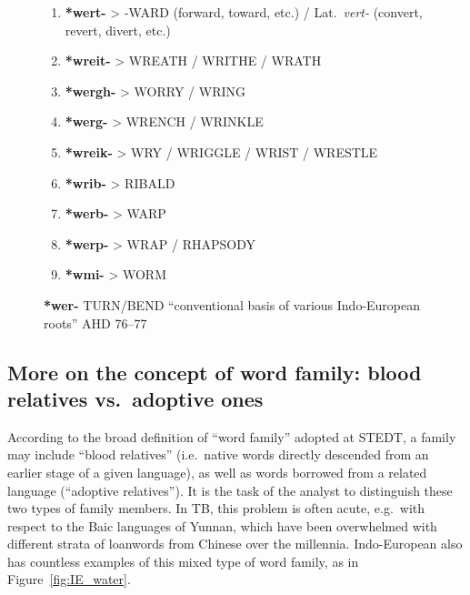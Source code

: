 \begin{figure}[h!]
\centering
\begin{enumerate}
\item \textbf{*wert-}	>	-WARD	(forward, toward, etc.) / Lat.\ \textit{vert-} (convert, revert, divert, etc.)

\item \textbf{*wreit-}	>	WREATH / WRITHE / WRATH

\item \textbf{*wergh-}	>	WORRY / WRING

\item \textbf{*werg-}	>	WRENCH / WRINKLE

\item \textbf{*wreik-}	>	WRY / WRIGGLE / WRIST / WRESTLE

\item \textbf{*wrib-}	>	RIBALD

\item \textbf{*werb-}	>	WARP

\item \textbf{*werp-}	>	WRAP / RHAPSODY

\item \textbf{*wmi-}	>	WORM
\end{enumerate}
\caption{\textbf{*wer-} TURN/BEND “conventional basis of various Indo-European roots” AHD 76–77}
\label{fig:IE_turn-bend}
\end{figure}

\subsection{More on the concept of word family: blood relatives vs.\ adoptive ones}

According to the broad definition of “word family” adopted at STEDT, a family may include “blood relatives” (i.e.\ native words directly descended from an earlier stage of a given language), as well as words borrowed from a related language (“adoptive relatives”). It is the task of the analyst to distinguish these two types of family members. In TB, this problem is often acute, e.g.\ with respect to the Baic languages of Yunnan, which have been overwhelmed with different strata of loanwords from Chinese over the millennia. Indo-European also has countless examples of this mixed type of word family, as in Figure~\ref{fig:IE_water}.

